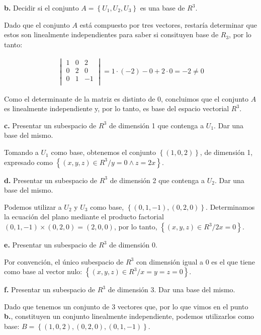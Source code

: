 \documentclass[12pt]{article}
\begin{document}
\hspace{6mm}\textbf{b.}
Decidir si el conjunto \(A = \left\{U_{1}, U_{2}, U_{3}\right\}\) es una base
de \(R^{3}\).

Dado que el conjunto \(A\) está compuesto por tres vectores,
restaría determinar que estos son linealmente independientes para saber
si consituyen base de \(R_{3}\), por lo tanto:

\begin{align*}
  \begin{vmatrix}
    1 & 0 & 2  \\
    0 & 2 & 0  \\
    0 & 1 & -1 \\
  \end{vmatrix} = 1 \cdot (-2) - 0 + 2 \cdot 0 = \boxed{-2 \neq 0}
\end{align*}

Como el determinante de la matriz es distinto de 0,
concluimos que el conjunto \(A\) es linealmente independiente y,
por lo tanto,
es base del espacio vectorial \(R^{3}\).

\hspace{6mm}\textbf{c.}
Presentar un subespacio de \(R^{3}\) de dimensión 1 que contenga a \(U_{1}\).
Dar una base del mismo.

Tomando a \(U_{1}\) como base, obtenemos el conjunto \(\left\{(1,0,2)\right\}\),
de dimensión 1, expresado como \(\left\{(x,y,z) \in R^{3} / y = 0 \land z=2x \right\}\).

\hspace{6mm}\textbf{d.}
Presentar un subespacio de \(R^{3}\) de dimensión 2 que contenga a \(U_{2}\).
Dar una base del mismo.

Podemos utilizar a \(U_{2}\) y \(U_{3}\) como base,
\(\left\{(0,1,-1), (0,2,0)\right\}\).
Determinamos la ecuación del plano mediante el producto factorial
\((0,1,-1) \times (0,2,0) = (2,0,0)\), por lo tanto,
\(\left\{(x,y,z) \in R^{3} / 2x = 0 \right\}\).

\hspace{6mm}\textbf{e.}
Presentar un subespacio de \(R^{3}\) de dimensión 0.

Por convención, el único subespacio de \(R^{3}\) con dimensión igual a 0 es
el que tiene como base al vector nulo:
\(\left\{(x,y,z) \in R^{3} / x = y = z = 0 \right\}\).

\hspace{6mm}\textbf{f.}
Presentar un subespacio de \(R^{3}\) de dimensión 3.
Dar una base del mismo.

Dado que tenemos un conjunto de 3 vectores que,
por lo que vimos en el punto \textbf{b.},
constituyen un conjunto linealmente independiente,
podemos utilizarlos como base:
\(B = \left\{(1,0,2), (0,2,0), (0,1,-1)\right\}\).
\end{document}
